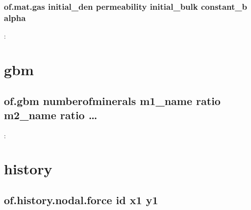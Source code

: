 \documentclass[letterpaper,10pt,english]{sphinxmanual}
\begin{document}
\subsection{of.mat.gas initial\_den permeability initial\_bulk constant\_b alpha}
\label{\detokenize{rst_tutorials/command_line_guide:of-mat-gas-initial-den-permeability-initial-bulk-constant-b-alpha}}
:

\begin{sphinxVerbatim}[commandchars=\\\{\}]
        
  
\end{sphinxVerbatim}


\chapter{gbm}
\label{\detokenize{rst_tutorials/command_line_guide:gbm}}

\section{of.gbm numberofminerals m1\_name ratio m2\_name ratio …}
\label{\detokenize{rst_tutorials/command_line_guide:of-gbm-numberofminerals-m1-name-ratio-m2-name-ratio}}
:

\begin{sphinxVerbatim}[commandchars=\\\{\}]
         
\end{sphinxVerbatim}


\chapter{history}
\label{\detokenize{rst_tutorials/command_line_guide:history}}

\section{of.history.nodal.force id x1 y1}
\label{\detokenize{rst_tutorials/command_line_guide:of-history-nodal-force-id-x1-y1}}
\end{document}
